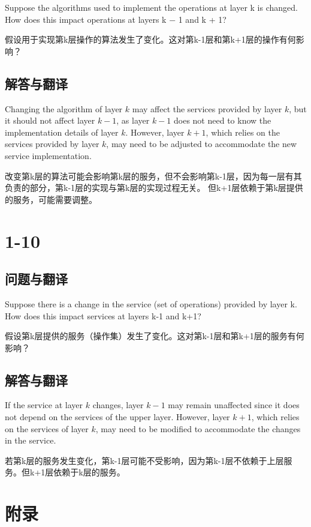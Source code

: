 Suppose the algorithms used to implement the operations at layer k is changed. How does this impact operations at layers k − 1 and k + 1?

假设用于实现第k层操作的算法发生了变化。这对第k-1层和第k+1层的操作有何影响？

\subsection{解答与翻译}

Changing the algorithm of layer \( k \) may affect the services provided by layer \( k \), but it should not affect layer \( k-1 \), as layer \( k-1 \) does not need to know the implementation details of layer \( k \). However, layer \( k+1 \), which relies on the services provided by layer \( k \), may need to be adjusted to accommodate the new service implementation.

改变第k层的算法可能会影响第k层的服务，但不会影响第k-1层，因为每一层有其负责的部分，第k-1层的实现与第k层的实现过程无关。
但k+1层依赖于第k层提供的服务，可能需要调整。

\section{1-10}

\subsection{问题与翻译}

Suppose there is a change in the service (set of operations) provided by layer k. How does this impact services at layers k-1 and k+1?

假设第k层提供的服务（操作集）发生了变化。这对第k-1层和第k+1层的服务有何影响？

\subsection{解答与翻译}

If the service at layer \( k \) changes, layer \( k-1 \) may remain unaffected since it does not depend on the services of the upper layer. However, layer \( k+1 \), which relies on the services of layer \( k \), may need to be modified to accommodate the changes in the service.

若第k层的服务发生变化，第k-1层可能不受影响，因为第k-1层不依赖于上层服务。但k+1层依赖于k层的服务。

\newpage{}

\section{附录}

